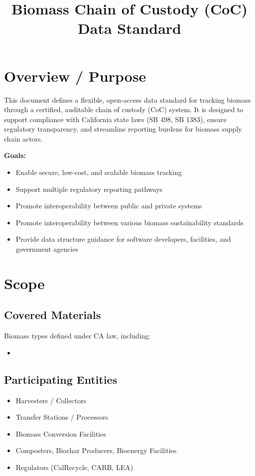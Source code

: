 \documentclass{article}
\title{Biomass Chain of Custody (CoC) Data Standard}
\date{}
\begin{document}
\maketitle

\section{Overview / Purpose}
This document defines a flexible, open-access data standard for tracking biomass through a certified, auditable chain of custody (CoC) system. It is designed to support compliance with California state laws (SB 498, SB 1383), ensure regulatory transparency, and streamline reporting burdens for biomass supply chain actors.

\textbf{Goals:}
\begin{itemize}[noitemsep]
    \item Enable secure, low-cost, and scalable biomass tracking
    \item Support multiple regulatory reporting pathways
    \item Promote interoperability between public and private systems
    \item Promote interoperability between various biomass sustainability standards
    \item Provide data structure guidance for software developers, facilities, and government agencies
\end{itemize}

\section{Scope}
\subsection*{Covered Materials}
Biomass types defined under CA law, including:
\begin{itemize}[noitemsep]
    \item 
\end{itemize}

\subsection*{Participating Entities}
\begin{itemize}[noitemsep]
    \item Harvesters / Collectors
    \item Transfer Stations / Processors
    \item Biomass Conversion Facilities
    \item Composters, Biochar Producers, Bioenergy Facilities
    \item Regulators (CalRecycle, CARB, LEA)
\end{itemize}
\end{document}
